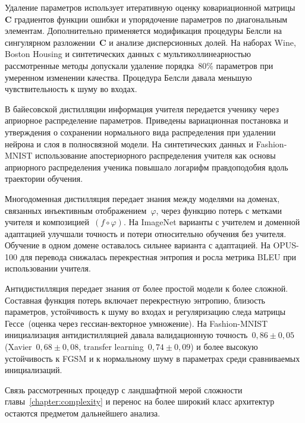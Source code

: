 Удаление параметров использует итеративную оценку ковариационной матрицы~$\mathbf{C}$ градиентов функции ошибки и упорядочение параметров по диагональным элементам. Дополнительно применяется модификация процедуры Белсли на сингулярном разложении~$\mathbf{C}$ и анализе дисперсионных долей. На наборах Wine, Boston Housing и синтетических данных с мультиколлинеарностью рассмотренные методы допускали удаление порядка~$80\%$ параметров при умеренном изменении качества. Процедура Белсли давала меньшую чувствительность к шуму во входах.

В байесовской дистилляции информация учителя передается ученику через априорное распределение параметров. Приведены вариационная постановка и утверждения о сохранении нормального вида распределения при удалении нейрона и слоя в полносвязной модели. На синтетических данных и Fashion-MNIST использование апостериорного распределения учителя как основы априорного распределения ученика повышало логарифм правдоподобия вдоль траектории обучения.

Многодоменная дистилляция передает знания между моделями на доменах, связанных инъективным отображением~$\varphi$, через функцию потерь с метками учителя и композицией~$(f\circ\varphi)$. На ImageNet варианты с учителем и доменной адаптацией улучшали точность и потери относительно обучения без учителя. Обучение в одном домене оставалось сильнее варианта с адаптацией. На OPUS-100 для перевода снижалась перекрестная энтропия и росла метрика BLEU при использовании учителя.

Антидистилляция передает знания от более простой модели к более сложной. Составная функция потерь включает перекрестную энтропию, близость параметров, устойчивость к шуму во входах и регуляризацию следа матрицы Гессе~(оценка через гессиан-векторное умножение). На Fashion-MNIST инициализация антидистилляцией давала валидационную точность~$0{,}86\pm 0{,}05$ (Xavier~$0{,}68\pm 0{,}08$, transfer learning~$0{,}74\pm 0{,}09$) и более высокую устойчивость к FGSM и к нормальному шуму в параметрах среди сравниваемых инициализаций.

Связь рассмотренных процедур с ландшафтной мерой сложности главы~\ref{chapter:complexity} и перенос на более широкий класс архитектур остаются предметом дальнейшего анализа.